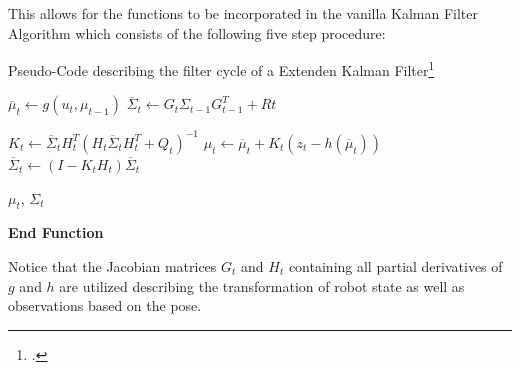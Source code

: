 %

This allows for the functions to be incorporated in the vanilla Kalman Filter Algorithm which consists of the following five step procedure:

\begin{algorithm}[H]
	\caption{Pseudo-Code describing the filter cycle of a Extenden Kalman Filter\footcite[Page 51]{thrun2002probabilisticRobotics}}
	
	{
		$ \overline{\mu}_{t} \gets g( u_{t}, \mu_{t - 1} ) $\;
		$ \overline{\Sigma}_{t} \gets G_{t} \Sigma_{t-1} G^{T}_{t-1} + R{t} $\;
	
		$ K_{t} \gets \overline{\Sigma}_{t} H^{T}_{t} ( H_{t} \overline{\Sigma}_{t} H^{T}_{t} + Q_{t} )^{-1} $\;
		$ \mu_{t} \gets \overline{\mu}_{t} + K_{t} ( z_{t} - h( \overline{\mu}_{t} ) ) $\;
		$ \overline{\Sigma}_{t} \gets ( I - K_{t} H_{t} ) \overline{\Sigma}_{t} $\;
		
		\Return $\mu_{t}$, $\Sigma_{t}$\;
	}
	\textbf{End Function}	
\end{algorithm}

Notice that the Jacobian matrices $G_{t}$ and $H_{t}$ containing all partial derivatives of $g$ and $h$ are utilized describing the transformation of robot state as well as observations based on the pose.



